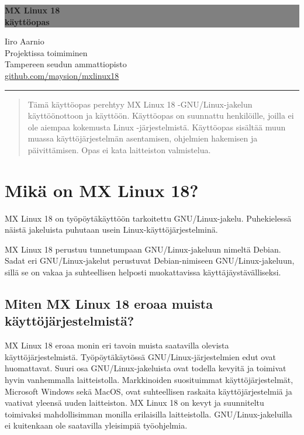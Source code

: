 \documentclass[a4paper, 12pt, finnish]{article}
\begin{document}
\begin{titlepage}
	\colorbox{grey}{
		\parbox[t]{0.93\textwidth}{
			\parbox[t]{0.91\textwidth}{
				\raggedleft
				\fontsize{80pt}{80pt}\selectfont
				\vspace{0.7cm}
				\textbf{MX Linux 18\\
				käyttöopas\\}
				\vspace{0.7cm}
			}
		}
	}
	\vfill
	\parbox[t]{0.93\textwidth}{
		\raggedleft
		\large
		{\Large Iiro Aarnio}\\[4pt]
		Projektissa toimiminen\\
		Tampereen seudun ammattiopisto\\[4pt]
		\url{github.com/maysion/mxlinux18}\\
		\hfill\rule{0.2\linewidth}{1pt}
	}
\end{titlepage}
\thispagestyle{empty}
\begin{abstract}
	Tämä käyttöopas perehtyy MX Linux 18 -GNU/Linux-jakelun käyttöönottoon ja käyttöön. Käyttöopas on suunnattu henkilöille, joilla ei ole aiempaa kokemusta Linux -järjestelmistä. Käyttöopas sisältää muun muassa käyttöjärjestelmän asentamisen, ohjelmien hakemisen ja päivittämisen. Opas ei kata laitteiston valmistelua.
\end{abstract}

\newpage
\thispagestyle{empty}
\tableofcontents
\newpage
{}
\setcounter{page}{1}
\newpage


\section{Mikä on MX Linux 18?}
MX Linux 18 on työpöytäkäyttöön tarkoitettu GNU/Linux-jakelu. Puhekielessä näistä jakeluista puhutaan usein Linux-käyttöjärjestelminä.

MX Linux 18 perustuu tunnetumpaan GNU/Linux-jakeluun nimeltä Debian. Sadat eri GNU/Linux-jakelut perustuvat Debian-nimiseen GNU/Linux-jakeluun, sillä se on vakaa ja suhteellisen helposti muokattavissa käyttäjäystävälliseksi.

\subsection{Miten MX Linux 18 eroaa muista käyttöjärjestelmistä?}
MX Linux 18 eroaa monin eri tavoin muista saatavilla olevista käyttöjärjestelmistä.
Työpöytäkäytössä GNU/Linux-järjestelmien edut ovat huomattavat. Suuri osa GNU/Linux-jakeluista ovat todella kevyitä ja toimivat hyvin vanhemmalla laitteistolla. Markkinoiden suosituimmat käyttöjärjestelmät, Microsoft Windows sekä MacOS, ovat suhteellisen raskaita käyttöjärjestelmiä ja vaativat yleensä uuden laitteiston. MX Linux 18 on kevyt ja suunniteltu toimivaksi mahdollisimman monilla erilaisilla laitteistolla. GNU/Linux-jakeluilla ei kuitenkaan ole saatavilla yleisimpiä työohjelmia.
\end{document}
